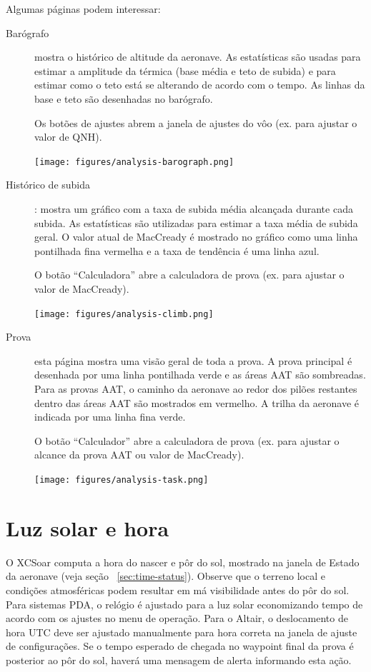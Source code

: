 Algumas páginas podem interessar:
\begin{description}
\item[Barógrafo]  mostra o histórico de altitude da aeronave.  As estatísticas são usadas para estimar a amplitude da térmica (base média e teto de subida) e para estimar como o teto está se alterando de acordo com o tempo.  As linhas da base e teto são desenhadas no barógrafo.

Os botões de ajustes abrem a janela de ajustes do vôo (ex. para ajustar o valor de QNH).  


\begin{center}
\texttt{[image: figures/analysis-barograph.png]}
\end{center}

\item[Histórico de subida]
  :   mostra um gráfico com a taxa de subida média alcançada durante cada subida.  As estatísticas são utilizadas para estimar a taxa média de subida geral.  O valor atual de MacCready é mostrado no gráfico como uma linha pontilhada fina vermelha e a taxa de tendência é uma linha azul.

O botão “Calculadora” abre a calculadora de prova (ex. para ajustar o valor de MacCready).  


\begin{center}
\texttt{[image: figures/analysis-climb.png]}
\end{center}

\item[Prova]
 esta página mostra uma visão geral de toda a prova.  A prova principal é desenhada por uma linha pontilhada verde e as áreas AAT são sombreadas.  Para as provas AAT, o caminho da aeronave ao redor dos pilões restantes dentro das áreas AAT são mostrados em vermelho.  A trilha da aeronave é indicada por uma linha fina verde.

O botão “Calculador” abre a calculadora de prova (ex. para ajustar o alcance da prova AAT ou valor de MacCready).


\begin{center}
\texttt{[image: figures/analysis-task.png]}
\end{center}

\end{description}

\section{Luz solar e hora}

O XCSoar computa a hora do nascer e pôr do sol, mostrado na janela de Estado da aeronave (veja seção ~\ref{sec:time-status}).  Observe que o terreno local e condições atmosféricas podem resultar em má visibilidade antes do pôr do sol.
Para sistemas PDA, o relógio é ajustado para a luz solar economizando tempo de acordo com os ajustes no menu de operação.  Para o Altair, o deslocamento de hora UTC deve ser ajustado manualmente para hora correta na janela de ajuste de configurações.
Se o tempo esperado de chegada no waypoint final da prova é posterior ao pôr do sol, haverá uma mensagem de alerta informando esta ação.


